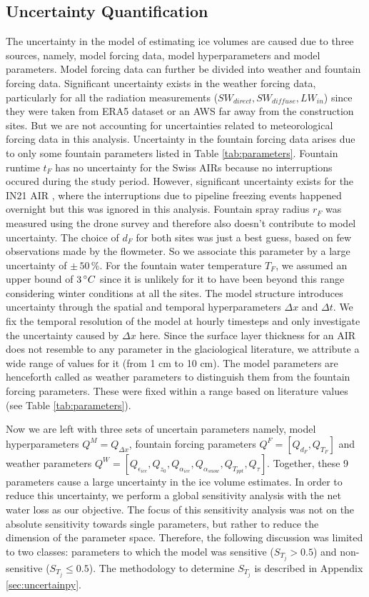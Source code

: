 \documentclass[utf8]{frontiersSCNS}
\begin{document}
\subsection{Uncertainty Quantification}

The uncertainty in the model of estimating ice volumes are caused due to three sources, namely, model forcing
data, model hyperparameters and model parameters. Model forcing data can further be divided into weather and
fountain forcing data. Significant uncertainty exists in the weather forcing data, particularly for all the
radiation measurements ($SW_{direct}, SW_{diffuse}, LW_{in}$) since they were taken from ERA5 dataset or an AWS
far away from the construction sites. But we are not accounting for uncertainties related to meteorological
forcing data in this analysis. Uncertainty in the fountain forcing data arises due to only some fountain
parameters listed in Table \ref{tab:parameters}. Fountain runtime $t_F$ has no uncertainty for the Swiss AIRs
because no interruptions occured during the study period. However, significant uncertainty exists for the IN21
AIR , where the interruptions due to pipeline freezing events happened overnight but this was ignored in this
analysis. Fountain spray radius $r_F$ was measured using the drone survey and therefore also doesn't contribute
to model uncertainty. The choice of $d_F$ for both sites was just a best guess, based on few observations made
by the flowmeter. So we associate this parameter by a large uncertainty of $\pm \,50\, \%$. For the fountain
water temperature $T_F$, we assumed an upper bound of $3\, \degree C$ since it is unlikely for it to have been
beyond this range considering winter conditions at all the sites. The model structure introduces uncertainty
through the spatial and temporal hyperparameters $\Delta x$ and $\Delta t$. We fix the temporal resolution of
the model at hourly timesteps and only investigate the uncertainty caused by $\Delta x$ here. Since the surface
layer thickness for an AIR does not resemble to any parameter in the glaciological literature, we attribute a
wide range of values for it (from 1 cm to 10 cm). The model parameters are henceforth called as weather parameters to distinguish
them from the fountain forcing parameters. These were fixed within a range based on literature values (see Table
\ref{tab:parameters}). 

Now we are left with three sets of uncertain parameters namely, model hyperparameters $Q^M = Q_{\Delta x}$,
fountain forcing parameters $Q^F = [Q_{d_F}, Q_{T_F}]$ and weather parameters $Q^W = [Q_{\epsilon_{ice}},
Q_{z_0}, Q_{\alpha_{ice}}, Q_{\alpha_{snow}}, Q_{T_{ppt}}, Q_{\tau}]$. Together, these 9 parameters cause a
large uncertainty in the ice volume estimates. In order to reduce this uncertainty, we perform a global
sensitivity analysis with the net water loss as our objective. The focus of this sensitivity analysis was not on
the absolute sensitivity towards single parameters, but rather to reduce the dimension of the parameter space.
Therefore, the following discussion was limited to two classes: parameters to which the model was sensitive
($S_{T_{j}} > 0.5$) and non-sensitive ($S_{T_{j}} \leq 0.5$). The methodology to determine $S_{T_{j}}$ is
described in Appendix \ref{sec:uncertainpy}.
\end{document}
